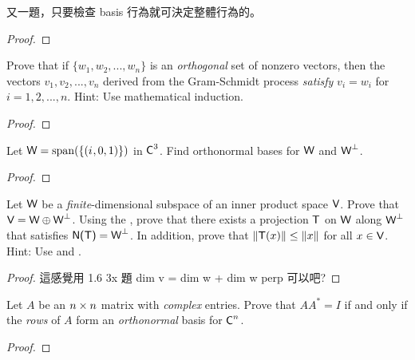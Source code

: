 \begin{note}
又一題，只要檢查 basis 行為就可決定整體行為的。
\end{note}

\begin{proof}
\end{proof}

\begin{exercise} \label{exercise 6.2.8}
Prove that if \(\{ w_1, w_2, ..., w_n \}\) is an \emph{orthogonal} set of nonzero vectors, then the vectors \(v_1, v_2, ..., v_n\) derived from the Gram-Schmidt process \emph{satisfy} \(v_i = w_i\) for \(i = 1, 2, ..., n\).
Hint: Use mathematical induction.
\end{exercise}

\begin{proof}
\end{proof}

\begin{exercise} \label{exercise 6.2.9}
Let \(\textsf{W} = \operatorname{span}(\{ ( {i\mkern1mu}, 0, 1) \})\) in \(\textsf{C}^3\).
Find orthonormal bases for \(\textsf{W}\) and \(\textsf{W}^{\perp}\).
\end{exercise}

\begin{proof}
\end{proof}

\begin{exercise} \label{exercise 6.2.10}
Let \(\textsf{W}\) be a \emph{finite}-dimensional subspace of an inner product space \(\textsf{V}\).
Prove that \(\textsf{V} = \textsf{W} \oplus \textsf{W}^{\perp}\).
Using the , prove that there exists a projection \(\textsf{T}\) on \(\textsf{W}\) along \(\textsf{W}^{\perp}\) that satisfies \(\textsf{N(T)} = \textsf{W}^{\perp}\).
In addition, prove that \(\left\lVert\textsf{T}(x)\right\rVert \le \left\lVert x\right\rVert\) for all \(x \in \textsf{V}\).
Hint: Use  and .
\end{exercise}

\begin{proof}
這感覺用 1.6 3x 題 dim v = dim w + dim w perp 可以吧?
\end{proof}

\begin{exercise} \label{exercise 6.2.11}
Let \(A\) be an \(n \times n\) matrix with \emph{complex} entries.
Prove that \(A A^* = I\) if and only if the \emph{rows} of \(A\) form an \emph{orthonormal} basis for \(\textsf{C}^n\).
\end{exercise}

\begin{proof}
\end{proof}

